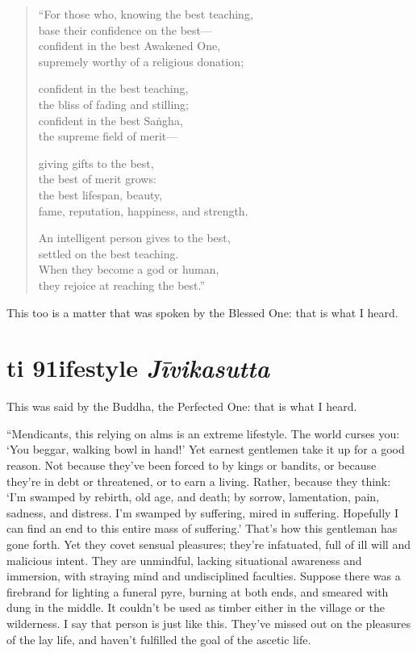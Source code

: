 \documentclass[12pt,openany]{book}%
\newcommand*{\suttatitleacronym}[1]{\smaller[2]{#1}\vspace*{.3em}}
\newcommand*{\suttatitletranslation}[1]{\linebreak{#1}}
\newcommand*{\suttatitleroot}[1]{\linebreak\smaller[2]\itshape{#1}}
\newcommand*{\tocacronym}[1]{\hspace*{-3.3em}{#1}\quad}
\newcommand*{\toctranslation}[1]{#1}
\newcommand*{\tocroot}[1]{(\textit{#1})}
\begin{document}
\begin{verse}%
“For those who, knowing the best teaching, \\
base their confidence on the best—\\
confident in the best Awakened One, \\
supremely worthy of a religious donation; 

confident in the best teaching, \\
the bliss of fading and stilling; \\
confident in the best \textsanskrit{Saṅgha}, \\
the supreme field of merit—

giving gifts to the best, \\
the best of merit grows: \\
the best lifespan, beauty, \\
fame, reputation, happiness, and strength. 

An intelligent person gives to the best, \\
settled on the best teaching. \\
When they become a god or human, \\
they rejoice at reaching the best.” 

%
\end{verse}

This too is a matter that was spoken by the Blessed One: that is what I heard. 

%
\section*{{\suttatitleacronym Iti 91}{\suttatitletranslation Lifestyle }{\suttatitleroot Jīvikasutta}}
\addcontentsline{toc}{section}{\tocacronym{Iti 91} \toctranslation{Lifestyle } \tocroot{Jīvikasutta}}

This was said by the Buddha, the Perfected One: that is what I heard. 

“Mendicants, this relying on alms is an extreme lifestyle. The world curses you: ‘You beggar, walking bowl in hand!’ Yet earnest gentlemen take it up for a good reason. Not because they’ve been forced to by kings or bandits, or because they’re in debt or threatened, or to earn a living. Rather, because they think: ‘I’m swamped by rebirth, old age, and death; by sorrow, lamentation, pain, sadness, and distress. I’m swamped by suffering, mired in suffering. Hopefully I can find an end to this entire mass of suffering.’ That’s how this gentleman has gone forth. Yet they covet sensual pleasures; they’re infatuated, full of ill will and malicious intent. They are unmindful, lacking situational awareness and immersion, with straying mind and undisciplined faculties. Suppose there was a firebrand for lighting a funeral pyre, burning at both ends, and smeared with dung in the middle. It couldn’t be used as timber either in the village or the wilderness. I say that person is just like this. They’ve missed out on the pleasures of the lay life, and haven’t fulfilled the goal of the ascetic life. 
\end{document}
